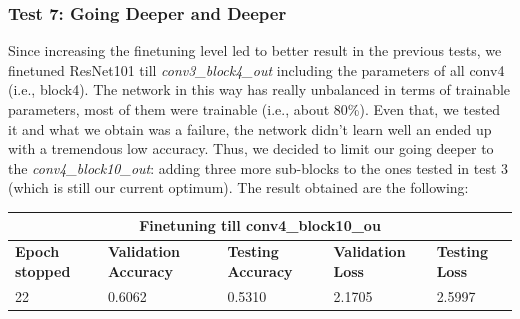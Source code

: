 \subsubsection{Test 7: Going Deeper and Deeper}
Since increasing the finetuning level led to better result in the previous tests, we finetuned ResNet101 till \textit{conv3\_block4\_out} including the parameters of all conv4 (i.e., block4). The network in this way has really unbalanced in terms of trainable parameters, most of them were trainable (i.e., about 80\%). Even that, we tested it and what we obtain was a failure, the network didn't learn well an ended up with a tremendous low accuracy. Thus, we decided to limit our going deeper to the \textit{conv4\_block10\_out}: adding three more sub-blocks to the ones tested in test 3 (which is still our current optimum).
\noindent The result obtained are the following:

\medskip

\begin{tabular}{ |p{2cm}|p{2cm}|p{2cm}|p{2cm}|p{2cm}|  }
\hline
\multicolumn{5}{|c|}{Finetuning till conv4\_block10\_ou} \\
\hline
\textbf{Epoch stopped} & \textbf{Validation Accuracy} & \textbf{Testing Accuracy} & \textbf{Validation Loss} & \textbf{Testing Loss} \\
\hline
22 & 0.6062 & 0.5310 & 2.1705 & 2.5997\\
\hline
\end{tabular}

